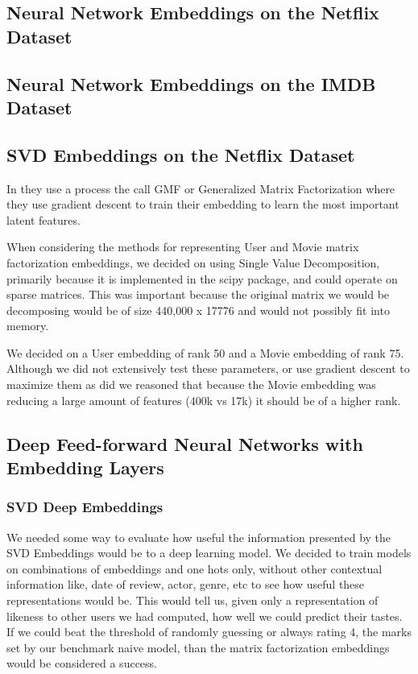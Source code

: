 \subsection{Neural Network Embeddings on the Netflix Dataset}
\subsection{Neural Network Embeddings on the IMDB Dataset}

\subsection{SVD Embeddings on the Netflix Dataset}

In \cite{He2017} they use a process the call GMF or Generalized Matrix Factorization where they use gradient descent to train their embedding to learn the most important latent features.

When considering the methods for representing User and Movie matrix factorization embeddings, we decided on using Single Value Decomposition, primarily because it is implemented in the scipy package, and could operate on sparse matrices. This was important because the original matrix we would be decomposing would be of size 440,000 x 17776 and would not possibly fit into memory. 

We decided on a User embedding of rank 50 and a Movie embedding of rank 75. Although we did not extensively test these parameters, or use gradient descent to maximize them as \cite{He2017} did we reasoned that because the Movie embedding was reducing a large amount of features (400k vs 17k) it should be of a higher rank. 

\subsection{Deep Feed-forward Neural Networks with Embedding Layers}

\subsubsection{SVD Deep Embeddings}
We needed some way to evaluate how useful the information presented by the SVD Embeddings would be to a deep learning model. We decided to train models on combinations of embeddings and one hots only, without other contextual information like, date of review, actor, genre, etc to see how useful these representations would be. This would tell us, given only a representation of likeness to other users we had computed, how well we could predict their tastes. If we could beat the threshold of randomly guessing or always rating 4, the marks set by our benchmark naive model, than the matrix factorization embeddings would be considered a success.

